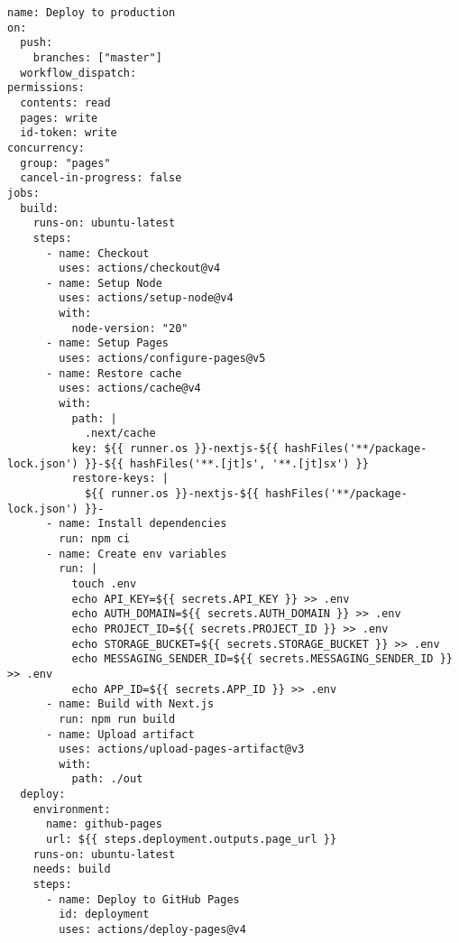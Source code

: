 \begin{verbatim}
name: Deploy to production
on:
  push:
    branches: ["master"]
  workflow_dispatch:
permissions:
  contents: read
  pages: write
  id-token: write
concurrency:
  group: "pages"
  cancel-in-progress: false
jobs:
  build:
    runs-on: ubuntu-latest
    steps:
      - name: Checkout
        uses: actions/checkout@v4
      - name: Setup Node
        uses: actions/setup-node@v4
        with:
          node-version: "20"
      - name: Setup Pages
        uses: actions/configure-pages@v5
      - name: Restore cache
        uses: actions/cache@v4
        with:
          path: |
            .next/cache
          key: ${{ runner.os }}-nextjs-${{ hashFiles('**/package-lock.json') }}-${{ hashFiles('**.[jt]s', '**.[jt]sx') }}
          restore-keys: |
            ${{ runner.os }}-nextjs-${{ hashFiles('**/package-lock.json') }}-
      - name: Install dependencies
        run: npm ci
      - name: Create env variables
        run: |
          touch .env
          echo API_KEY=${{ secrets.API_KEY }} >> .env
          echo AUTH_DOMAIN=${{ secrets.AUTH_DOMAIN }} >> .env
          echo PROJECT_ID=${{ secrets.PROJECT_ID }} >> .env
          echo STORAGE_BUCKET=${{ secrets.STORAGE_BUCKET }} >> .env
          echo MESSAGING_SENDER_ID=${{ secrets.MESSAGING_SENDER_ID }} >> .env
          echo APP_ID=${{ secrets.APP_ID }} >> .env
      - name: Build with Next.js
        run: npm run build
      - name: Upload artifact
        uses: actions/upload-pages-artifact@v3
        with:
          path: ./out
  deploy:
    environment:
      name: github-pages
      url: ${{ steps.deployment.outputs.page_url }}
    runs-on: ubuntu-latest
    needs: build
    steps:
      - name: Deploy to GitHub Pages
        id: deployment
        uses: actions/deploy-pages@v4
\end{verbatim}
